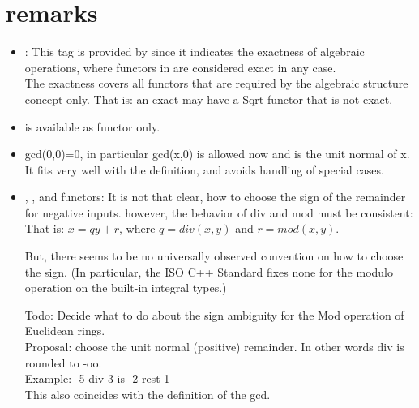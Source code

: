\section{remarks}
\begin{itemize}
\item {}: 
This tag is provided by  since it indicates the 
exactness of algebraic operations, where functors in 
are considered exact in any case. \\
The exactness covers all functors that are required by the 
algebraic structure concept only. 
That is: an exact  may have a Sqrt functor that is not exact. \\

\item {} is available as functor only.\\

\item gcd(0,0)=0, in particular gcd(x,0) is allowed now and is the unit normal of x. 
      It fits very well with the definition, 
       and avoids handling of special cases. \\

\item {}, ,  and functors:
        It is not that clear, how to choose the sign of the remainder for negative inputs. 
        however, the behavior of div and mod must be consistent: \\
        That is: $ x = qy + r $, where $q= div(x,y)$ and $r = mod(x,y)$.
        
        But, there seems to be no universally observed convention on how to choose 
        the sign. (In particular, the ISO C++ Standard fixes none for the modulo operation 
        on the built-in integral types.)

        Todo: Decide what to do about the sign ambiguity for the Mod operation of Euclidean rings.\\
        Proposal: choose the unit normal (positive) remainder. In other words div is rounded to -oo.\\
        Example: -5 div 3 is -2 rest 1 \\
        This also coincides with the definition of the gcd. 
\end{itemize}


